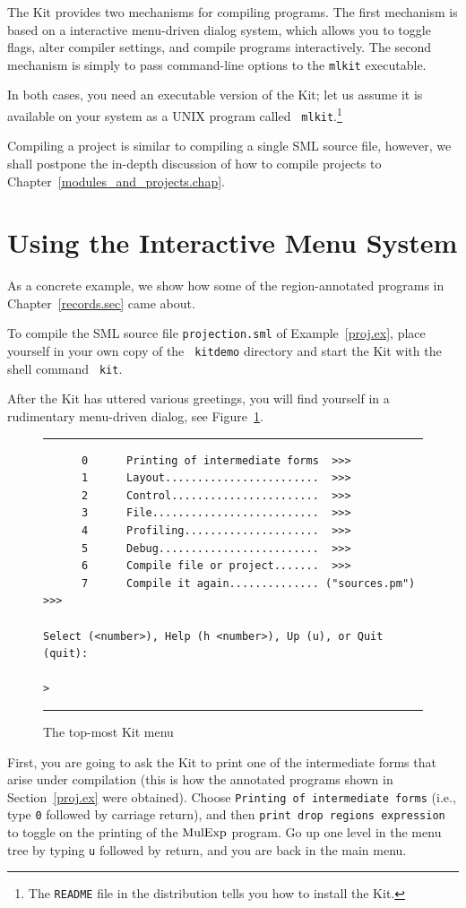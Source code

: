 \documentclass[12pt]{book}
\begin{document}
The Kit provides two mechanisms for compiling programs. The first
mechanism is based on a
%
interactive menu-driven dialog system, which allows you to toggle
flags, alter compiler settings, and compile programs interactively.
The second mechanism is simply to pass
%
command-line options to the {\tt mlkit} executable.

In both cases, you need an executable version of the Kit; let us
assume it is available on your system as a UNIX program called {\tt
  mlkit}.\footnote{The {\tt README} file in the distribution tells you
  how to install the Kit.}

Compiling a project is similar to compiling a single SML source file,
however, we shall postpone the in-depth discussion of how to compile
projects to Chapter~\ref{modules_and_projects.chap}.

\section{Using the Interactive Menu System}

As a concrete example, we show how some of the region-annotated
programs in Chapter~\ref{records.sec} came about.

To compile the SML source file {\tt projection.sml} of
Example~\ref{proj.ex}, place yourself in your own copy of the {\tt
  kitdemo} directory and start the Kit with the shell command {\tt
  kit}.

After the Kit has uttered various greetings, you will find yourself in
a rudimentary menu-driven dialog, see Figure~\ref{dialogue.fig}.
\begin{figure}
\hrule \medskip
\begin{verbatim}
      0      Printing of intermediate forms  >>>
      1      Layout........................  >>>
      2      Control.......................  >>>
      3      File..........................  >>>
      4      Profiling.....................  >>>
      5      Debug.........................  >>>
      6      Compile file or project.......  >>>
      7      Compile it again.............. ("sources.pm") >>>

Select (<number>), Help (h <number>), Up (u), or Quit (quit): 

>
\end{verbatim}
\caption{The top-most Kit menu}
\medskip \hrule 
\label{dialogue.fig}
\end{figure}
First, you are going to ask the Kit to print one of the intermediate
forms that arise under compilation (this is how the annotated programs
shown in  Section~\ref{proj.ex} were obtained). 
Choose \texttt{Printing of intermediate forms} (i.e., type \texttt{0}
followed by carriage return), and then \texttt{print drop regions
expression} to toggle on the printing of the $\hbox{\rm MulExp}$ program.
Go up one level in the menu tree by typing \texttt{u} followed by return,
and you are back in the main menu.
\end{document}

